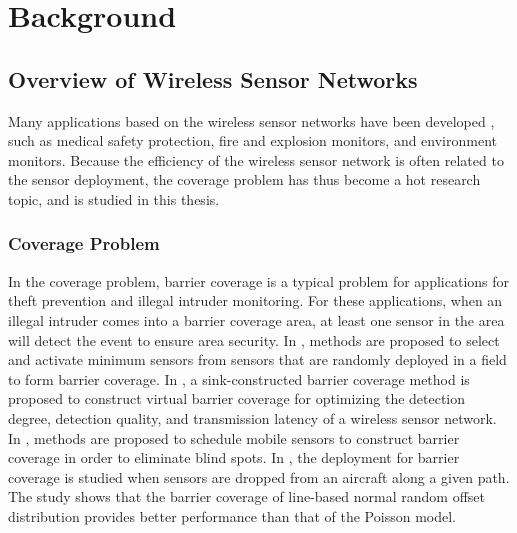 

\chapter{Background}
\label{background}
\ifpdf
    \graphicspath{{Figures/chapter3/PNG/}{Figures/chapter3/PDF/}{Figures/chapter3/}}
\else
    \graphicspath{{Figures/chapter3/EPS/}{Figures/chapter3/}}
\fi




\section{Overview of Wireless Sensor Networks}

Many applications based on the wireless sensor networks have been
developed \cite{5381599,5705791,5706178,1607984,6421447,7110295}, such as
medical safety protection, fire and explosion monitors, and
environment monitors. Because the efficiency of the wireless sensor
network is often related to the sensor deployment, the coverage
problem has thus become a hot research topic, and is studied in this
thesis.

\subsection{Coverage Problem}

In the coverage problem, barrier coverage is a typical problem for
applications for theft prevention and illegal intruder monitoring.
For these applications, when an illegal intruder comes into a
barrier coverage area, at least one sensor in the area will detect
the event to ensure area security. In
\cite{Kumar:2005:BCW:1080829.1080859}, methods are proposed to
select and activate minimum sensors from sensors that are randomly
deployed in a field to form barrier coverage. In \cite{6398741}, a
sink-constructed barrier coverage method is proposed to construct
virtual barrier coverage for optimizing the detection degree,
detection quality, and transmission latency of a wireless sensor
network. In \cite{4520201,6133536}, methods are proposed to schedule
mobile sensors to construct barrier coverage in order to eliminate
blind spots. In \cite{5061914}, the deployment for barrier coverage
is studied when sensors are dropped from an aircraft along a given
path. The study shows that the barrier coverage of line-based normal
random offset distribution provides better performance than that of
the Poisson model.


